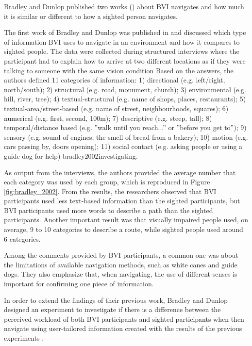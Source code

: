 Bradley and Dunlop published two works (\citeyear{bradley2002investigating,bradley2005experimental}) about BVI navigates and how much it is similar or different to how a sighted person navigates. 

The first work of Bradley and Dunlop was published in \citeyear{bradley2002investigating} and discussed which type of information BVI uses to navigate in an environment and how it compares to sighted people. The data were collected during structured interviews where the participant had to explain how to arrive at two different locations as if they were talking to someone with the same vision condition \cite{bradley2002investigating}
\citeyear{}
Based on the answers, the authors defined 11 categories of information: 1) directional (e.g. left/right, north/south); 2) structural (e.g. road, monument, church); 3) environmental (e.g. hill, river, tree); 4) textual-structural (e.g. name of shops, places, restaurants); 5) textual-area/street-based (e.g. name of street, neighbourhoods, squares); 6) numerical (e.g. first, second, 100m); 7) descriptive (e.g. steep, tall); 8) temporal/distance based (e.g. ”walk until you reach...” or ”before you get to”); 9) sensory (e.g. sound of engines, the smell of bread from a bakery); 10) motion (e.g. cars passing by, doors opening); 11) social contact (e.g. asking people or using a guide dog for help) {bradley2002investigating}.

As output from the interviews, the authors provided the average number that each category was used by each group, which is reproduced in Figure \ref{fig:bradley_2002}. From the results, the researchers observed that BVI participants used less text-based information than the sighted participants, but BVI participants used more words to describe a path than the sighted participants. Another important result was that visually impaired people used, on average, 9 to 10 categories to describe a route, while sighted people used around 6 categories.



Among the comments provided by BVI participants, a common one was about the limitations of available navigation methods, such as white canes and guide dogs. They also emphasize that, when navigating, the use of different senses is important for confirming one piece of information. 

In order to extend the findings of their previous work, Bradley and Dunlop designed an experiment to investigate if there is a difference between the perceived workload of both BVI participants and sighted participants when then navigate using user-tailored information created with the results of the previous experiments \cite{bradley2005experimental}.

